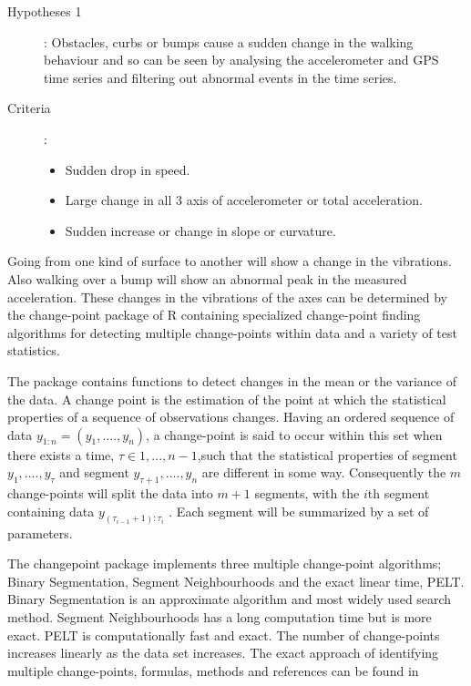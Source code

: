 \begin{description}
\item[Hypotheses 1] : Obstacles, curbs or bumps cause a sudden change in the walking behaviour and so can be seen by analysing the accelerometer and GPS time series and filtering out abnormal events in the time series.  
\item[Criteria]: 
\begin{itemize}
\item Sudden drop in speed.
\item Large change in all 3 axis of accelerometer or total acceleration. 
\item Sudden increase or change in slope or curvature. 
\end{itemize}
\end{description}

Going from one kind of surface to another will show a change in the vibrations. Also walking over a bump will show an abnormal peak in the measured acceleration. These changes in the vibrations of the axes can be determined by the change-point package of R containing specialized change-point finding algorithms for detecting multiple change-points within data and a variety of test statistics.~\cite{changepoint2015,  killick2014} 

The package contains functions to detect changes in the mean or the variance of the data. A change point is the estimation of the point at which the statistical properties of a sequence of observations changes. Having an ordered sequence of data $y_{1:n} = (y_{1}, .... , y_{n})$, a change-point is said to occur within this set when there exists a time, $τ ∈ {1, . . . , n − 1}$,such that the statistical properties of segment ${y_{1}, .... , y_{τ}}$ and segment ${y_{τ+1}, .... , y_{n}}$ are different in some way. Consequently the $m$ change-points will split the data into $m + 1$ segments, with the $i$th segment containing data $y_{(τ_{i−1} +1):τ_{i}}$ . Each segment will be summarized by a set of parameters.~\cite{killick2014}




The changepoint package implements three multiple change-point algorithms; Binary Segmentation, Segment Neighbourhoods and the exact linear time, PELT. Binary Segmentation is an approximate algorithm and most widely used search method. Segment Neighbourhoods has a long computation time but is more exact. PELT is computationally fast and exact. The number of change-points increases linearly as the data set increases. The exact approach of identifying multiple change-points, formulas, methods and references can be found in~\cite{killick2014}

